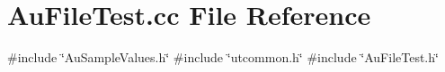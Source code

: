 \section{Au\+File\+Test.\+cc File Reference}
\label{AuFileTest_8cc}
{\ttfamily \#include \char`\"{}Au\+Sample\+Values.\+h\char`\"{}}\newline
{\ttfamily \#include \char`\"{}utcommon.\+h\char`\"{}}\newline
{\ttfamily \#include \char`\"{}Au\+File\+Test.\+h\char`\"{}}\newline
